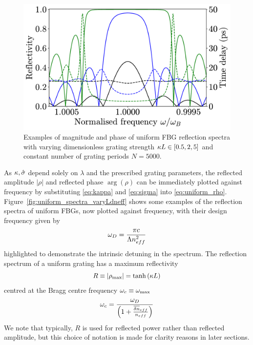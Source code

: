 %
\begin{figure}
    
\includegraphics[width=\linewidth]{Images/Uniform_varying_kL_Rtau.pdf}

\caption{Examples of magnitude and phase of uniform FBG reflection spectra with varying dimensionless grating strength $\kappa L \in [0.5, 2, 5]$ and constant number of grating periods $N=5000$.}

\label{fig:uniform_spectra_varykL}
\end{figure}
%
\par
%
As $\kappa, \hat{\sigma}$ depend solely on $\lambda$ and the prescribed grating parameters, 
the reflected amplitude $|\rho|$ and reflected phase $\arg(\rho)$ can be immediately plotted against frequency by substituting \eqref{eq:kappa} and \eqref{eq:sigma} into \eqref{eq:uniform_rho}. 
Figure~\ref{fig:uniform_spectra_varyLdneff} shows some examples of the reflection spectra of uniform FBGs, now plotted against frequency, with their design frequency given by
%
\begin{equation}
    \omega_D = \frac{\pi c}{\Lambda n_{eff}^2}
\end{equation}
%
highlighted to demonstrate the intrinsic detuning in the spectrum. The reflection spectrum of a uniform grating has a maximum reflectivity 
%
\begin{equation}
\label{eq:rmax}
    R \equiv |\rho_\text{max}| = \tanh{(\kappa L)}
\end{equation}
%
centred at the Bragg centre frequency $\omega_c \equiv \omega_\text{max}$
%
\begin{equation}
\label{eq:wBragg}
    \omega_c = \frac{\omega_D}{\left( 1 + \frac{\overline{\delta n}_{eff} }{n_{eff}}\right)}
\end{equation}
%
We note that typically, $R$ is used for reflected power rather than reflected amplitude, but this choice of notation is made for clarity reasons in later sections. 
